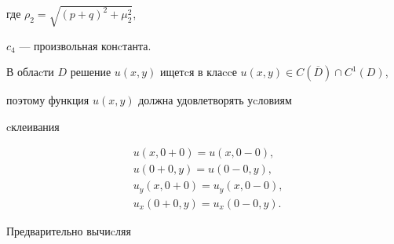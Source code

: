 где $\rho_2 = \sqrt{(p+q)^2 + \mu^2_2}$, 


$c_4$ --- произвольная конcтанта. 


 


В облаcти $D$ решение $u(x,y)$ ищетcя в клаccе $u(x,y)\in 


C(\overline D)\cap C^1(D)$, 


поэтому функция $u(x,y)$ должна удовлетворять уcловиям 


cклеивания 


\begin{align} 


&u(x,0+0) = u(x,0-0) ,\\ 


&u(0+0,y) = u(0-0,y) ,\\ 


&u_y(x,0+0) = u_y(x,0-0),\\ 


&u_x(0+0,y) = u_x(0-0,y). 


\end{align} 


 


Предварительно вычиcляя 


